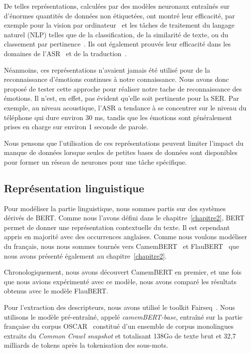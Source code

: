 De telles représentations, calculées par des modèles neuronaux entraînés sur d'énormes quantités de données non étiquetées, ont montré leur efficacité, par exemple pour la vision par ordinateur~\cite{Nanni2017} et les tâches de traitement du langage naturel (NLP) telles que de la
classification, de la similarité de texte, ou du classement par pertinence~\cite{Liu2019,Young2018,Yang2019}. Ils ont également prouvés leur efficacité dans les domaines de l'ASR~\cite{Kahn2020,Liu2020} et de la traduction~\cite{Nguyen2020}.

Néanmoins, ces représentations n'avaient jamais été utilisé pour de la reconnaissance d'émotions continues à notre connaissance. Nous avons donc proposé de tester cette approche pour réaliser notre tache de reconnaissance des émotions. Il n'est, en effet, pas évident qu'elle soit pertinente pour la SER. Par exemple, au niveau acoustique, l'ASR a tendance à se concentrer sur le niveau du téléphone qui dure environ 30 ms, tandis que les émotions sont généralement prises en charge sur environ 1 seconde de parole.

Nous pensons que l'utilisation de ces représentations peuvent limiter l'impact du manque de données lorsque seules de petites bases de données sont disponibles pour former un réseau de neurones pour une tâche spécifique.

\subsection{Représentation linguistique}
Pour modéliser la partie linguistique, nous sommes partis sur des systèmes dérivés de BERT. Comme nous l'avons défini dans le chapitre~\ref{chapitre2}, BERT permet de donner une représentation contextuelle du texte. Il est cependant appris en majorité avec des occurrences anglaises. Comme nous voulons modéliser du français, nous nous sommes tournés vers CamemBERT~\cite{Martin2020} et FlauBERT~\cite{Le2020} que nous avons présenté également au chapitre~\ref{chapitre2}.

Chronologiquement, nous avons découvert CamemBERT en premier, et une fois que nous avions expérimenté avec ce modèle, nous avons comparé les résultats obtenus avec le modèle FlauBERT.

Pour l'extraction des descripteurs, nous avons utilisé le toolkit Fairseq~\cite{Ott2019}. Nous utilisons le modèle pré-entraîné, appelé \textit{camemBERT-base}, entraîné sur la partie française du corpus OSCAR~\cite{Ortizsuarez2019} constitué d'un ensemble de corpus monolingues extraits du \textit{Common Crawl snapshot} et totalisant 138Go de texte brut et 32,7 milliards de tokens après la tokenisation des sous-mots.

